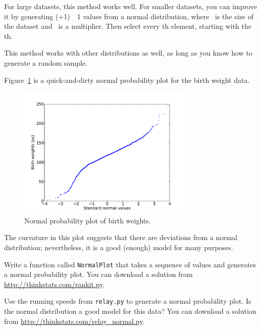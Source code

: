\documentclass[12pt]{book}
\begin{document}
For large datasets, this method works well.
For smaller datasets, you can improve it by generating \m (\n+1)~\minus~1
values from a normal distribution, where \n~is the size of the
dataset and \m~is a multiplier.  Then select every \m th element,
starting with the \m th.  


This method works with other distributions as well, as long as
you know how to generate a random sample.

Figure~\ref{nsfg_birthwgt_normal} is a quick-and-dirty normal
probability plot for the birth weight data.

\begin{figure}
\centerline{\includegraphics[height=2.5in]{figs/nsfg_birthwgt_normal.pdf}}
\caption{Normal probability plot of birth weights.}
\label{nsfg_birthwgt_normal}
\end{figure}

The curvature in this plot suggests that there are
deviations from a normal distribution; nevertheless, it is a
good (enough) model for many purposes.

\begin{exercise}
Write a function called {\tt NormalPlot} that takes a sequence of
values and generates a normal probability plot.  You can download
a solution from \url{http://thinkstats.com/rankit.py}.

Use the running speeds from {\tt relay.py} to generate a normal
probability plot.  Is the normal distribution a good model for this
data?  You can download a solution from
\url{http://thinkstats.com/relay_normal.py}.

\end{exercise}
\end{document}
